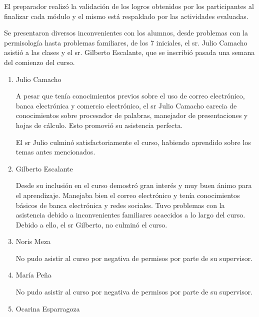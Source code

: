                 El preparador realizó la validación de los logros obtenidos por los participantes al finalizar cada módulo y el mismo está respaldado por las actividades evaluadas.
                
                Se presentaron diversos inconvenientes con los alumnos, desde problemas con la permisología hasta problemas familiares, de los 7 iniciales, el sr. Julio Camacho asistió a las clases y el sr. Gilberto Escalante, que se inscribió pasada una semana del comienzo del curso.
                
                \begin{enumerate}
                    \item Julio Camacho
                    
                    A pesar que  tenía conocimientos previos sobre el uso de correo electrónico, banca electrónica y  comercio electrónico, el sr Julio Camacho carecia de conocimientos sobre procesador de palabras, manejador de presentaciones y hojas de cálculo. Esto promovió su asistencia perfecta.
                   
                    El sr Julio culminó satisfactoriamente el curso, habiendo aprendido sobre los temas antes mencionados.
                    
                    \item Gilberto Escalante
                    
                    Desde su inclusión en el curso demostró gran interés y muy buen ánimo para el aprendizaje. Manejaba bien el correo electrónico y tenía conocimientos básicos de banca electrónica y redes sociales. Tuvo problemas con la asistencia debido a inconvenientes familiares acaecidos a lo largo del curso. Debido a ello, el sr Gilberto, no culminó el curso.
                    
                    \item Noris Meza
                    
                    No pudo asistir al curso por negativa de permisos por parte de su supervisor.
                    
                    \item María Peña
                    
                    No pudo asistir al curso por negativa de permisos por parte de su supervisor.
                    
                    \item Ocarina Esparragoza
                    

\end{enumerate}
